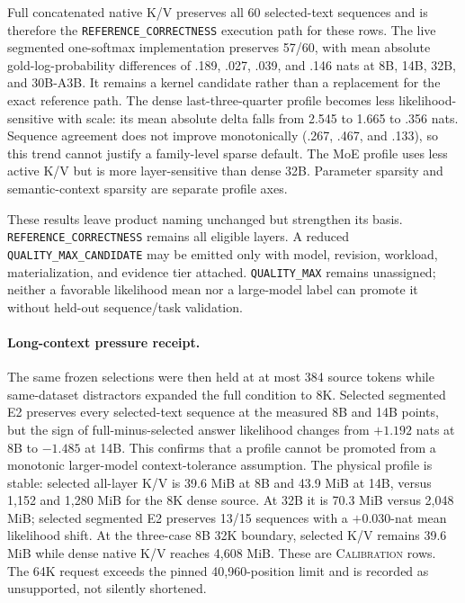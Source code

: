 \documentclass[11pt]{article}
\newcommand{\QualityMaxCandidate}{\texttt{QUALITY\_\allowbreak MAX\_\allowbreak CANDIDATE}}
\newcommand{\QualityMax}{\texttt{QUALITY\_\allowbreak MAX}}
\newcommand{\ReferenceCorrectness}{\texttt{REFERENCE\_\allowbreak CORRECTNESS}}
\begin{document}
Full concatenated native K/V preserves all 60 selected-text sequences and is
therefore the \ReferenceCorrectness{} execution path for these rows. The live
segmented one-softmax implementation preserves 57/60, with mean absolute
gold-log-probability differences of .189, .027, .039, and .146 nats at 8B,
14B, 32B, and 30B-A3B. It remains a kernel candidate rather than a replacement
for the exact reference path. The dense last-three-quarter profile becomes
less likelihood-sensitive with scale: its mean absolute delta falls from
2.545 to 1.665 to .356 nats. Sequence agreement does not improve monotonically
(.267, .467, and .133), so this trend cannot justify a family-level sparse
default. The MoE profile uses less active K/V but is more layer-sensitive than
dense 32B. Parameter sparsity and semantic-context sparsity are separate
profile axes.

These results leave product naming unchanged but strengthen its basis.
\ReferenceCorrectness{} remains all eligible layers. A reduced
\QualityMaxCandidate{} may be emitted only with model, revision, workload,
materialization, and evidence tier attached. \QualityMax{} remains unassigned;
neither a favorable likelihood mean nor a large-model label can promote it
without held-out sequence/task validation.

\paragraph{Long-context pressure receipt.}
The same frozen selections were then held at at most 384 source tokens while
same-dataset distractors expanded the full condition to 8K. Selected segmented
E2 preserves every selected-text sequence at the measured 8B and 14B points,
but the sign of full-minus-selected answer likelihood changes from $+1.192$
nats at 8B to $-1.485$ at 14B. This confirms that a profile cannot be promoted
from a monotonic larger-model context-tolerance assumption. The physical
profile is stable: selected all-layer K/V is 39.6 MiB at 8B and 43.9 MiB at
14B, versus 1,152 and 1,280 MiB for the 8K dense source. At 32B it is 70.3 MiB
versus 2,048 MiB; selected segmented E2 preserves 13/15 sequences with a
$+0.030$-nat mean likelihood shift. At the three-case 8B
32K boundary, selected K/V remains 39.6 MiB while dense native K/V reaches
4,608 MiB. These are \textsc{Calibration} rows. The 64K request exceeds the
pinned 40,960-position limit and is recorded as unsupported, not silently
shortened.
\end{document}
